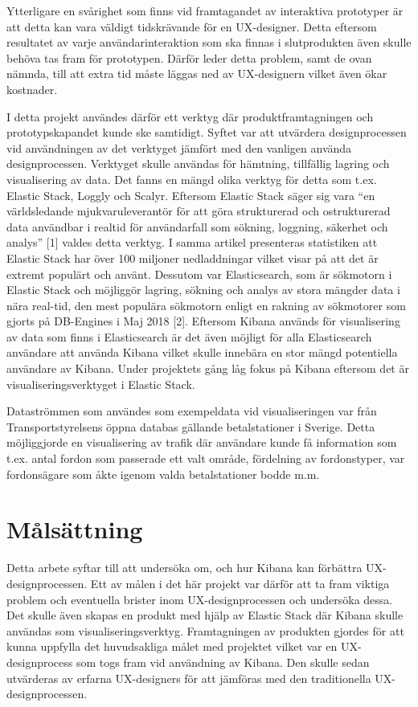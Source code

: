 \documentclass[12pt]{kththesis}
\begin{document}
Ytterligare en svårighet som finns vid framtagandet av interaktiva prototyper är att detta kan vara väldigt tidskrävande för en UX-designer. Detta eftersom resultatet av varje användarinteraktion som ska finnas i slutprodukten även skulle behöva tas fram för prototypen. Därför leder detta problem, samt de ovan nämnda, till att extra tid måste läggas ned av UX-designern vilket även ökar kostnader. 

I detta projekt användes därför ett verktyg där produktframtagningen och prototypskapandet kunde ske samtidigt. Syftet var att utvärdera designprocessen vid användningen av det verktyget jämfört med den vanligen använda designprocessen. Verktyget skulle användas för hämtning, tillfällig lagring och visualisering av data. Det fanns en mängd olika verktyg för detta som t.ex. Elastic Stack, Loggly och Scalyr. Eftersom Elastic Stack säger sig vara “en världsledande mjukvaruleverantör för att göra strukturerad och ostrukturerad data användbar i realtid för användarfall som sökning, loggning, säkerhet och analys” [1] valdes detta verktyg. I samma artikel presenteras statistiken att Elastic Stack har över 100 miljoner nedladdningar vilket visar på att det är extremt populärt och använt. Dessutom var Elasticsearch, som är sökmotorn i Elastic Stack och möjliggör lagring, sökning och analys av stora mängder data i nära real-tid, den mest populära sökmotorn enligt en rakning av sökmotorer som gjorts på DB-Engines i Maj 2018 [2]. Eftersom Kibana används för visualisering av data som finns i Elasticsearch är det även möjligt för alla Elasticsearch användare att använda Kibana vilket skulle innebära en stor mängd potentiella användare av Kibana. Under projektets gång låg fokus på Kibana eftersom det är visualiseringsverktyget i Elastic Stack.

Dataströmmen som användes som exempeldata vid visualiseringen var från Transportstyrelsens öppna databas gällande betalstationer i Sverige. Detta möjliggjorde en visualisering av trafik där användare kunde få information som t.ex. antal fordon som passerade ett valt område, fördelning av fordonstyper, var fordonsägare som åkte igenom valda betalstationer bodde m.m.

\section{Målsättning}
Detta arbete syftar till att undersöka om, och hur Kibana kan förbättra UX-designprocessen. Ett av målen i det här projekt var därför att ta fram viktiga problem och eventuella brister inom UX-designprocessen och undersöka dessa. Det skulle även skapas en produkt med hjälp av Elastic Stack där Kibana skulle användas som visualiseringsverktyg. Framtagningen av produkten gjordes för att kunna uppfylla det huvudsakliga målet med projektet vilket var en UX-designprocess som togs fram vid användning av Kibana. Den skulle sedan utvärderas av erfarna UX-designers för att jämföras med den traditionella UX-designprocessen. 
\end{document}
